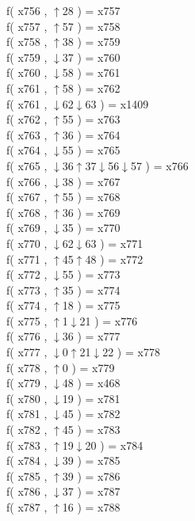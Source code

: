 f( x756 , $\uparrow$28 ) = x757 \\
f( x757 , $\uparrow$57 ) = x758 \\
f( x758 , $\uparrow$38 ) = x759 \\
f( x759 , $\downarrow$37 ) = x760 \\
f( x760 , $\downarrow$58 ) = x761 \\
f( x761 , $\uparrow$58 ) = x762 \\
f( x761 , $\downarrow$62$\downarrow$63 ) = x1409 \\
f( x762 , $\uparrow$55 ) = x763 \\
f( x763 , $\uparrow$36 ) = x764 \\
f( x764 , $\downarrow$55 ) = x765 \\
f( x765 , $\downarrow$36$\uparrow$37$\downarrow$56$\downarrow$57 ) = x766 \\
f( x766 , $\downarrow$38 ) = x767 \\
f( x767 , $\uparrow$55 ) = x768 \\
f( x768 , $\uparrow$36 ) = x769 \\
f( x769 , $\downarrow$35 ) = x770 \\
f( x770 , $\downarrow$62$\downarrow$63 ) = x771 \\
f( x771 , $\uparrow$45$\uparrow$48 ) = x772 \\
f( x772 , $\downarrow$55 ) = x773 \\
f( x773 , $\uparrow$35 ) = x774 \\
f( x774 , $\uparrow$18 ) = x775 \\
f( x775 , $\uparrow$1$\downarrow$21 ) = x776 \\
f( x776 , $\downarrow$36 ) = x777 \\
f( x777 , $\downarrow$0$\uparrow$21$\downarrow$22 ) = x778 \\
f( x778 , $\uparrow$0 ) = x779 \\
f( x779 , $\downarrow$48 ) = x468 \\
f( x780 , $\downarrow$19 ) = x781 \\
f( x781 , $\downarrow$45 ) = x782 \\
f( x782 , $\uparrow$45 ) = x783 \\
f( x783 , $\uparrow$19$\downarrow$20 ) = x784 \\
f( x784 , $\downarrow$39 ) = x785 \\
f( x785 , $\uparrow$39 ) = x786 \\
f( x786 , $\downarrow$37 ) = x787 \\
f( x787 , $\uparrow$16 ) = x788 \\
